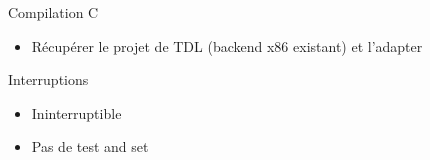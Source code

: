 \documentclass{beamer}
\begin{document}
  \begin{frame}{Compilation C}
    \begin{itemize}
      \item Récupérer le projet de TDL (backend x86 existant) et l'adapter
    \end{itemize}
  \end{frame}

  \begin{frame}{Interruptions}
    \begin{itemize}
      \item Ininterruptible
      \item Pas de test and set
    \end{itemize}
  \end{frame}
\end{document}

